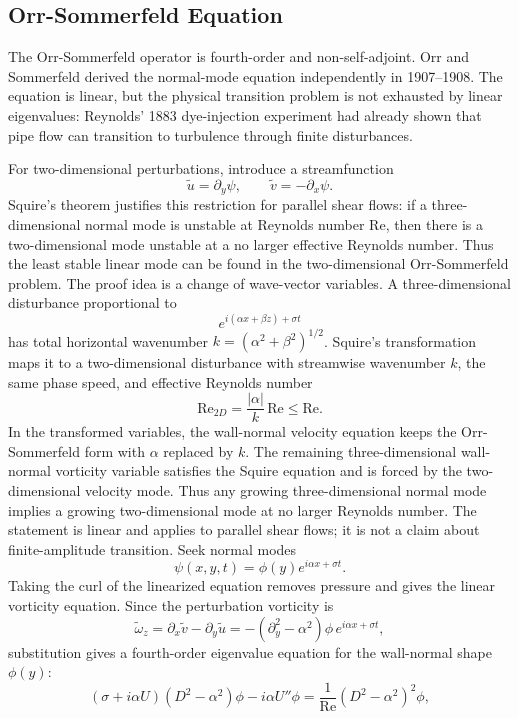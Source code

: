 \subsection{Orr-Sommerfeld Equation}
\label{subsec:orr-sommerfeld}

The Orr-Sommerfeld operator is fourth-order and non-self-adjoint. Orr and
Sommerfeld derived the normal-mode equation independently in 1907--1908. The
equation is linear, but the physical transition problem is not exhausted by
linear eigenvalues: Reynolds' 1883 dye-injection experiment had already shown
that pipe flow can transition to turbulence through finite disturbances.

For two-dimensional perturbations, introduce a streamfunction
\[
  \tilde u=\partial_y\psi,\qquad
  \tilde v=-\partial_x\psi.
\]
Squire's theorem justifies this restriction for parallel shear flows: if a
three-dimensional normal mode is unstable at Reynolds number \(\mathrm{Re}\),
then there is a two-dimensional mode unstable at a no larger effective Reynolds
number. Thus the least stable linear mode can be found in the two-dimensional
Orr-Sommerfeld problem.
The proof idea is a change of wave-vector variables. A three-dimensional
disturbance proportional to
\[
  e^{i(\alpha x+\beta z)+\sigma t}
\]
has total horizontal wavenumber \(k=(\alpha^2+\beta^2)^{1/2}\). Squire's
transformation maps it to a two-dimensional disturbance with streamwise
wavenumber \(k\), the same phase speed, and effective Reynolds number
\[
  \mathrm{Re}_{2D}=\frac{|\alpha|}{k}\,\mathrm{Re}\le \mathrm{Re}.
\]
In the transformed variables, the wall-normal velocity equation keeps the
Orr-Sommerfeld form with \(\alpha\) replaced by \(k\). The remaining
three-dimensional wall-normal vorticity variable satisfies the Squire equation
and is forced by the two-dimensional velocity mode. Thus any growing
three-dimensional normal mode implies a growing two-dimensional mode at no
larger Reynolds number. The statement is linear and applies to parallel shear
flows; it is not a claim about finite-amplitude transition.
Seek normal modes
\[
  \psi(x,y,t)=\phi(y)e^{i\alpha x+\sigma t}.
\]
Taking the curl of the linearized equation removes pressure and gives the
linear vorticity equation. Since the perturbation vorticity is
\[
  \tilde\omega_z
  =
  \partial_x\tilde v-\partial_y\tilde u
  =
  -(\partial_y^2-\alpha^2)\phi\,e^{i\alpha x+\sigma t},
\]
substitution gives a fourth-order eigenvalue equation for the wall-normal
shape \(\phi(y)\):
\[
  \boxed{
  (\sigma+i\alpha U)(D^2-\alpha^2)\phi
  -
  i\alpha U''\phi
  =
  \frac1{\mathrm{Re}}(D^2-\alpha^2)^2\phi,
  }
\]
